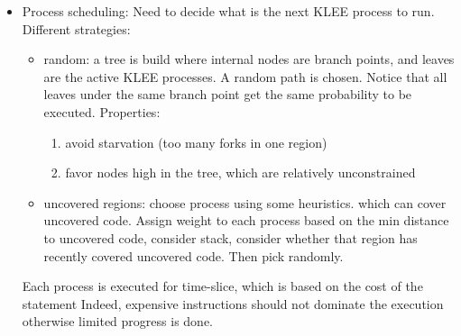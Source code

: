 \documentclass[10pt, a4paper]{article}
\begin{document}
\begin{itemize}

  \item Process scheduling: Need to decide what is the next KLEE process to run. Different strategies:
    \begin{itemize}
      \item random: a tree is build where internal nodes are branch points, and leaves are the active KLEE processes. A random path is chosen. Notice that all leaves under the same branch point get the same probability to be executed. Properties:
        \begin{enumerate}
          \item avoid starvation (too many forks in one region)
          \item favor nodes high in the tree, which are relatively unconstrained
        \end{enumerate}
      \item uncovered regions: choose process using some heuristics. which can cover uncovered code. Assign weight to each process based on the min distance to uncovered code, consider stack, consider whether that region has recently covered uncovered code. Then pick randomly.
    \end{itemize}
    Each process is executed for time-slice, which is based on the cost of the statement Indeed, expensive instructions should not dominate the execution otherwise limited progress is done.


\end{itemize}
\end{document}
